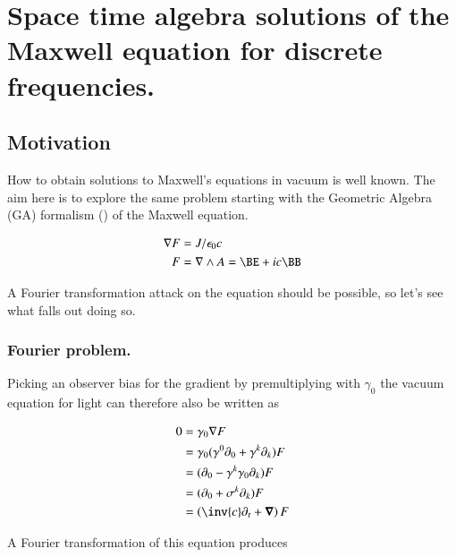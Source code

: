 

\chapter{Space time algebra solutions of the Maxwell equation for discrete frequencies.}
\label{chap:maxwellVacuum}
\date{July 2, 2009}

\beginArtWithToc

\section{Motivation}

How to obtain solutions to Maxwell's equations in vacuum is well known.  The aim here is to explore the same problem starting with the Geometric Algebra (GA) formalism (\cite{doran2003gap}) of the Maxwell equation.

\begin{align}\label{eqn:maxwell}
\grad F &= J/\epsilon_0 c \\
F &= \grad \wedge A = \BE + i c \BB
\end{align}

A Fourier transformation attack on the equation should be possible, so let's see what falls out doing so.

\subsection{Fourier problem.}

Picking an observer bias for the gradient by premultiplying with $\gamma_0$ the vacuum equation for light can therefore also be written as

\begin{align*}
0
&= \gamma_0 \grad F \\
&= \gamma_0 (\gamma^0 \partial_0 + \gamma^k \partial_k) F \\
&= (\partial_0 - \gamma^k \gamma_0 \partial_k) F \\
&= (\partial_0 + \sigma^k \partial_k) F \\
&= \left(\inv{c}\partial_t + \spacegrad \right) F \\
\end{align*}

A Fourier transformation of this equation produces

